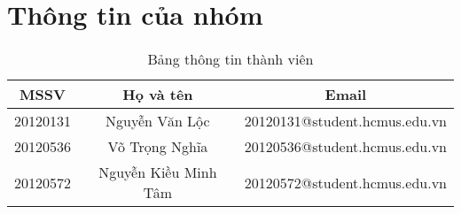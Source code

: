 \section{Thông tin của nhóm}
\begin{table}[H]
\begin{center}
\begin{tabular}{|c|c|c|}
\hline 
MSSV & Họ và tên & Email \\ 
\hline 
20120131 & Nguyễn Văn Lộc & 20120131@student.hcmus.edu.vn \\ 
\hline 
20120536 & Võ Trọng Nghĩa & 20120536@student.hcmus.edu.vn \\ 
\hline 
20120572 & Nguyễn Kiều Minh Tâm & 20120572@student.hcmus.edu.vn \\ 
\hline 
\end{tabular}
\caption{Bảng thông tin thành viên} 
\end{center}
\end{table}

